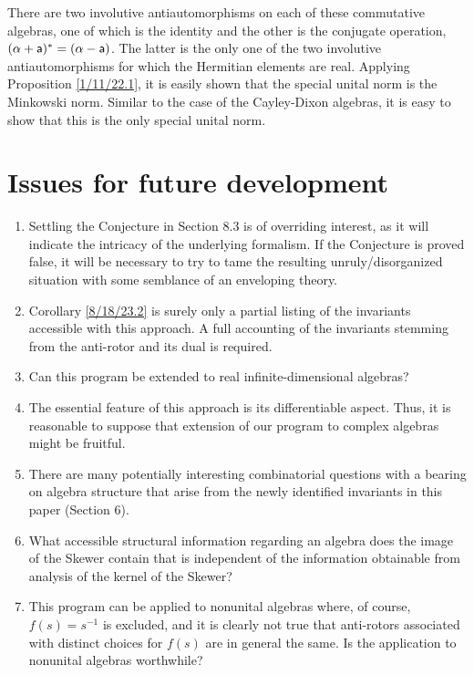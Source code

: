 \documentclass{amsart}
\theoremstyle{definition}
\numberwithin{theorem}{section}
\numberwithin{equation}{section}
\begin{document}
 There are two involutive antiautomorphisms on each of these commutative algebras, one of which is the identity and the other is the conjugate operation, $(\alpha+ {\sf a})^* = (\alpha- {\sf a})$. The latter is the only one of the two involutive antiautomorphisms  for which the Hermitian elements are real.  Applying Proposition \ref{1/11/22.1}, it is easily shown that the special unital norm is the Minkowski norm.  Similar to the case of the Cayley-Dixon algebras, it is easy to show that this is the only special unital norm.

\bigskip\bigskip

\section{Issues for future development} 

\begin{enumerate}
\item Settling the Conjecture in Section 8.3 is of overriding interest, as it will indicate the intricacy of the underlying formalism.  If the Conjecture is proved false, it will be necessary to try to tame the resulting unruly/disorganized situation with some semblance of an enveloping theory.
\item Corollary \ref{8/18/23.2} is surely only a partial listing of the invariants accessible with this approach.  A full accounting of the invariants stemming from the anti-rotor and its dual is required.
\item Can this program be extended to real infinite-dimensional algebras?
\item The essential feature of this approach is its differentiable aspect.  Thus, it is reasonable to suppose that extension of our program to complex algebras might be fruitful. 
\item There are many potentially interesting combinatorial questions with a bearing on algebra structure that arise from the newly identified invariants in this paper (Section 6). \item What accessible structural information regarding an algebra does the image of the Skewer contain that is independent of the information obtainable from analysis of the kernel of the Skewer? 
\item This program can be applied to nonunital algebras where, of course, $f(s)=s^{-1}$ is excluded, and it is clearly not true that anti-rotors associated with distinct choices for $f(s)$ are in general the same.  Is the application to nonunital algebras worthwhile?
\end{enumerate}
\end{document}
